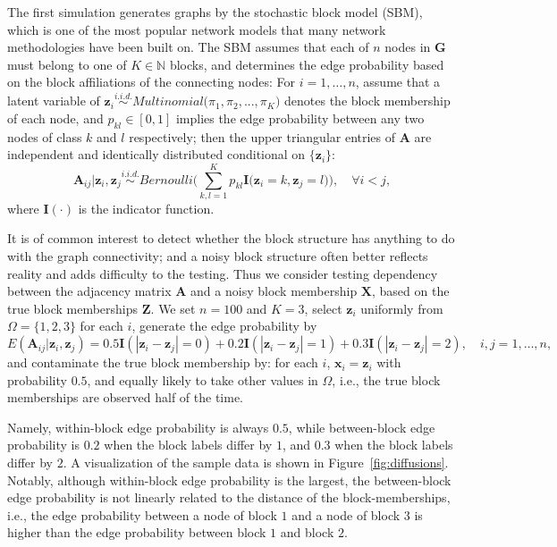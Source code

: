 \documentclass[11pt]{article}
\theoremstyle{definition}
\begin{document}
The first simulation generates graphs by the stochastic block model (SBM), which is one of the most popular network models that many network methodologies have been built on. The SBM assumes that each of $n$ nodes in $\mathbf{G}$ must belong to one of $K \in \mathbb{N}$ blocks, and determines the edge probability based on the block affiliations of the connecting nodes: For $i=1,\ldots,n$, assume that a latent variable of $\mathbf{z}_{i} \overset{i.i.d.}{\sim} Multinomial\big( \pi_{1}, \pi_{2}, ... , \pi_{K} \big)$ denotes the block membership of each node, and $p_{kl} \in [0,1]$ implies the edge probability between any two nodes of class $k$ and $l$ respectively; then the upper triangular entries of $\mathbf{A}$ are independent and identically distributed conditional on $\{\mathbf{z}_{i}\}$:
\begin{equation} 
\mathbf{A}_{ij} \big| \mathbf{z}_{i}, \mathbf{z}_{j} \overset{i.i.d.}{\sim} Bernoulli\big( \sum\limits_{k,l=1}^{K} p_{kl} \mathbf{I} \big( \mathbf{z}_{i} = k, \mathbf{z}_{j} = l  \big)    \big), \quad \forall  i < j,
\end{equation}
where $\mathbf{I}(\cdot)$ is the indicator function. %

It is of common interest to detect whether the block structure has anything to do with the graph connectivity; and a noisy block structure often better reflects reality and adds difficulty to the testing. Thus we consider testing dependency between the adjacency matrix $\mathbf{A}$ and a noisy block membership $\mathbf{X}$, based on the true block memberships $\mathbf{Z}$. 
We set $n=100$ and $K=3$, select $\mathbf{z}_i$ uniformly from $\Omega=\{1,2,3\}$ for each $i$, generate the edge probability by
\begin{equation}
\label{eq:Three}
E(\mathbf{A}_{ij} | \mathbf{z}_{i}, \mathbf{z}_{j}) = 0.5 \mathbf{I}(|\mathbf{z}_{i} - \mathbf{z}_{j}| = 0) + 0.2 \mathbf{I}(|\mathbf{z}_{i} - \mathbf{z}_{j}| = 1) + 0.3 \mathbf{I}(|\mathbf{z}_{i} - \mathbf{z}_{j}| = 2), \quad i,j = 1, \ldots, n,
\end{equation} 
and contaminate the true block membership by: for each $i$, $\mathbf{x}_{i}=\mathbf{z}_{i}$ with probability $0.5$, and equally likely to take other values in $\Omega$, i.e., the true block memberships are observed half of the time.

Namely, within-block edge probability is always $0.5$, while between-block edge probability is $0.2$ when the block labels differ by $1$, and $0.3$ when the block labels differ by $2$. A visualization of the sample data is shown in Figure~\ref{fig:diffusions}. 
Notably, although within-block edge probability is the largest, the between-block edge probability is not linearly related to the distance of the block-memberships, i.e., the edge probability between a node of block $1$ and a node of block $3$ is higher than the edge probability between block $1$ and block $2$. 
\end{document}
